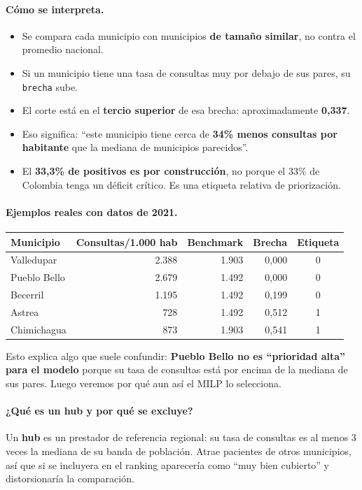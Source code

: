 \documentclass[11pt,a4paper]{article}
\newcommand{\code}[1]{\texttt{#1}}
\begin{document}
\paragraph{Cómo se interpreta.}
\begin{itemize}[leftmargin=*]
  \item Se compara cada municipio con municipios \textbf{de tamaño similar}, no contra el promedio nacional.
  \item Si un municipio tiene una tasa de consultas muy por debajo de sus pares, su \code{brecha} sube.
  \item El corte está en el \textbf{tercio superior} de esa brecha: aproximadamente \textbf{0,337}.
  \item Eso significa: ``este municipio tiene cerca de \textbf{34\% menos consultas por habitante} que la mediana de municipios parecidos''.
  \item El \textbf{33,3\% de positivos es por construcción}, no porque el 33\% de Colombia tenga un déficit crítico. Es una etiqueta relativa de priorización.
\end{itemize}

\paragraph{Ejemplos reales con datos de 2021.}

\begin{table}[H]
\centering
\small
\begin{tabular}{@{}l r r r c@{}}
\toprule
\textbf{Municipio} & \textbf{Consultas/1.000 hab} & \textbf{Benchmark} & \textbf{Brecha} & \textbf{Etiqueta} \\
\midrule
Valledupar & 2.388 & 1.903 & 0,000 & 0 \\
Pueblo Bello & 2.679 & 1.492 & 0,000 & 0 \\
Becerril & 1.195 & 1.492 & 0,199 & 0 \\
Astrea & 728 & 1.492 & 0,512 & 1 \\
Chimichagua & 873 & 1.903 & 0,541 & 1 \\
\bottomrule
\end{tabular}
\end{table}

Esto explica algo que suele confundir: \textbf{Pueblo Bello no es ``prioridad alta'' para el modelo} porque su tasa de consultas está por encima de la mediana de sus pares. Luego veremos por qué aun así el MILP lo selecciona.

\paragraph{¿Qué es un hub y por qué se excluye?}
Un \textbf{hub} es un prestador de referencia regional: su tasa de consultas es al menos 3 veces la mediana de su banda de población. Atrae pacientes de otros municipios, así que si se incluyera en el ranking aparecería como ``muy bien cubierto'' y distorsionaría la comparación.
\end{document}
